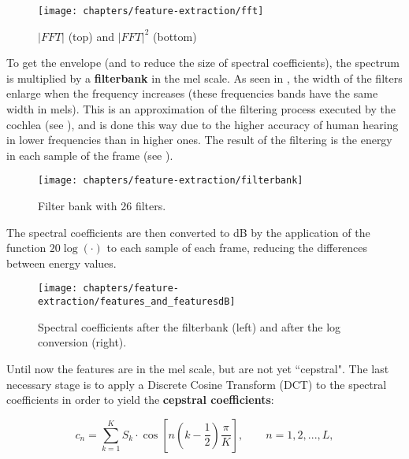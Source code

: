 \begin{figure}[ht]
    \centering
    \texttt{[image: chapters/feature-extraction/fft]}
    \caption{$|FFT|$ (top) and $|FFT|^2$ (bottom)}
    \label{fig:fft}
\end{figure}


To get the envelope (and to reduce the size of spectral coefficients), the spectrum is multiplied by a \textbf{filterbank} in the mel scale. As seen in , the width of the filters enlarge when the frequency increases (these frequencies bands have the same width in mels). This is an approximation of the filtering process executed by the cochlea (see ), and is done this way due to the higher accuracy of human hearing in lower frequencies than in higher ones. The result of the filtering is the energy in each sample of the frame (see ).

\begin{figure}[ht]
    \centering
    \texttt{[image: chapters/feature-extraction/filterbank]}
    \caption{Filter bank with 26 filters.}
    \label{fig:filterbank}
\end{figure}


The spectral coefficients are then converted to dB by the application of the function $20\log(\cdot)$ to each sample of each frame, reducing the differences between energy values.

\begin{figure}[ht]
    \centering
    \texttt{[image: chapters/feature-extraction/features\_and\_featuresdB]}
    \caption{Spectral coefficients after the filterbank (left) and after the log conversion (right).}
    \label{fig:features_and_featuresdB}
\end{figure}


Until now the features are in the mel scale, but are not yet ``cepstral". The last necessary stage is to apply a Discrete Cosine Transform (DCT) to the spectral coefficients in order to yield the \textbf{cepstral coefficients}:

\begin{equation}
    c_n = \sum_{k=1}^K S_k\cdot\cos\left[n\left(k - \frac{1}{2}\right)\frac{\pi}{K}\right],\qquad n = 1, 2, ..., L,
    \label{eq:dct}
\end{equation}

